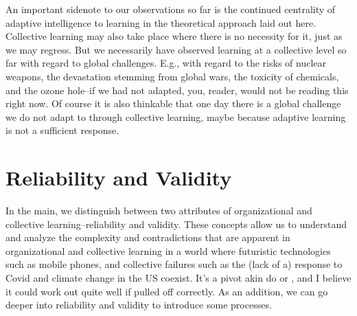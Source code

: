 \documentclass{article}
\begin{document}
	An important sidenote to our observations so far is the continued centrality of adaptive intelligence to learning in the theoretical approach laid out here. Collective learning may also take place where there is no necessity for it, just as we may regress. But we necessarily have observed learning at a collective level so far with regard to global challenges. E.g., with regard to the risks of nuclear weapons, the devastation stemming from global wars, the toxicity of chemicals, and the ozone hole--if we had not adapted, you, reader, would not be reading this right now. Of course it is also thinkable that one day there is a global challenge we do not adapt to through collective learning, maybe because adaptive learning is not a sufficient response.

	\section*{Reliability and Validity}

	In the main, we distinguish between two attributes of organizational and collective learning--reliability and validity. These concepts allow us to understand and analyze the complexity and contradictions that are apparent in organizational and collective learning in a world where futuristic technologies such as mobile phones, and collective failures such as the (lack of a) response to Covid and climate change in the US coexist. It's a pivot akin do \citep{Levinthal1993} or \citep{March1991a}, and I believe it could work out quite well if pulled off correctly. As an addition, we can go deeper into reliability and validity to introduce some processes.
	
	\clearpage
	\printbibliography
\end{document}
